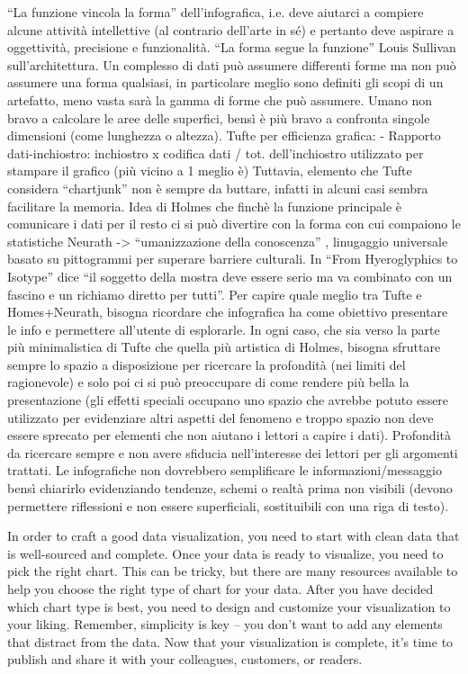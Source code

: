 “La funzione vincola la forma” dell'infografica, i.e. deve aiutarci a compiere alcune attività intellettive (al contrario dell'arte in sé) e pertanto deve aspirare a oggettività, precisione e funzionalità. 
“La forma segue la funzione” Louis Sullivan sull'architettura.
Un complesso di dati può assumere differenti forme ma non può assumere una forma qualsiasi, in particolare meglio sono definiti gli scopi di un artefatto, meno vasta sarà la gamma di forme che può assumere.
Umano non bravo a calcolare le aree delle superfici, bensì è più bravo a confronta singole dimensioni (come lunghezza o altezza).
Tufte per efficienza grafica:
-	Rapporto dati-inchiostro: inchiostro x codifica dati / tot. dell'inchiostro utilizzato per stampare il grafico (più vicino a 1 meglio è)
Tuttavia, elemento che Tufte considera “chartjunk” non è sempre da buttare, infatti in alcuni casi sembra facilitare la memoria. Idea di Holmes che finchè la funzione principale è comunicare i dati per il resto ci si può divertire con la forma con cui compaiono le statistiche
Neurath -> “umanizzazione della conoscenza” , linugaggio universale basato su pittogrammi per superare barriere culturali. In “From Hyeroglyphics to Isotype” dice “il soggetto della mostra deve essere serio ma va combinato con un fascino e un richiamo diretto per tutti”.
Per capire quale meglio tra Tufte e Homes+Neurath, bisogna ricordare che infografica ha come obiettivo presentare le info e permettere all'utente di esplorarle.
In ogni caso, che sia verso la parte più minimalistica di Tufte che quella più artistica di Holmes, bisogna sfruttare sempre lo spazio a disposizione per ricercare la profondità (nei limiti del ragionevole) e solo poi ci si può preoccupare di come rendere più bella la presentazione (gli effetti speciali occupano uno spazio che avrebbe potuto essere utilizzato per evidenziare altri aspetti del fenomeno e troppo spazio non deve essere sprecato per elementi che non aiutano i lettori a capire i dati). 
Profondità da ricercare sempre e non avere sfiducia nell'interesse dei lettori per gli argomenti trattati.
Le infografiche non dovrebbero semplificare le informazioni/messaggio bensì chiarirlo evidenziando tendenze, schemi o realtà prima non visibili (devono permettere riflessioni e non essere superficiali, sostituibili con una riga di testo).


In order to craft a good data visualization, you need to start with clean data that is well-sourced and complete. Once your data is ready to visualize, you need to pick the right chart. This can be tricky, but there are many resources available to help you choose the right type of chart for your data. 
After you have decided which chart type is best, you need to design and customize your visualization to your liking. Remember, simplicity is key – you don't want to add any elements that distract from the data. Now that your visualization is complete, it's time to publish and share it with your colleagues, customers, or readers.

